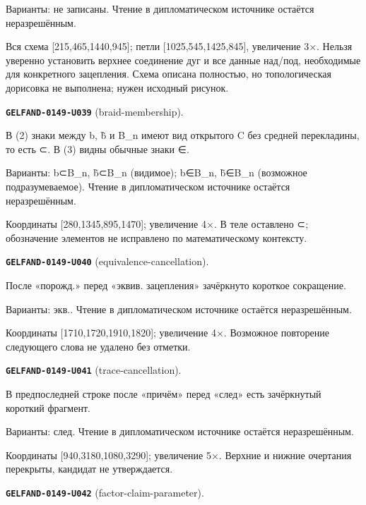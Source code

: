 \documentclass[11pt]{article}
\theoremstyle{definition}
\theoremstyle{remark}
\begin{document}
Варианты: не записаны. Чтение в дипломатическом источнике остаётся неразрешённым.\par
Вся схема [215,465,1440,945]; петли [1025,545,1425,845], увеличение 3×. Нельзя уверенно установить верхнее соединение дуг и все данные над/под, необходимые для конкретного зацепления. Схема описана полностью, но топологическая дорисовка не выполнена; нужен исходный рисунок.\par\medskip
\noindent\leavevmode{}\label{GELFAND-P001375:braid-membership:note}\textbf{\texttt{GELFAND-0149-U039}} (braid-membership).\par\nopagebreak[4]
В (2) знаки между b, b̃ и B\_n имеют вид открытого C без средней перекладины, то есть ⊂. В (3) видны обычные знаки ∈.\par
Варианты: b⊂B\_n, b̃⊂B\_n (видимое); b∈B\_n, b̃∈B\_n (возможное подразумеваемое). Чтение в дипломатическом источнике остаётся неразрешённым.\par
Координаты [280,1345,895,1470]; увеличение 4×. В теле оставлено ⊂; обозначение элементов не исправлено по математическому контексту.\par\medskip
\noindent\leavevmode{}\label{GELFAND-P001375:equivalence-cancellation:note}\textbf{\texttt{GELFAND-0149-U040}} (equivalence-cancellation).\par\nopagebreak[4]
После «порожд.» перед «эквив. зацепления» зачёркнуто короткое сокращение.\par
Варианты: экв.. Чтение в дипломатическом источнике остаётся неразрешённым.\par
Координаты [1710,1720,1910,1820]; увеличение 4×. Возможное повторение следующего слова не удалено без отметки.\par\medskip
\noindent\leavevmode{}\label{GELFAND-P001375:trace-cancellation:note}\textbf{\texttt{GELFAND-0149-U041}} (trace-cancellation).\par\nopagebreak[4]
В предпоследней строке после «причём» перед «след» есть зачёркнутый короткий фрагмент.\par
Варианты: след. Чтение в дипломатическом источнике остаётся неразрешённым.\par
Координаты [940,3180,1080,3290]; увеличение 5×. Верхние и нижние очертания перекрыты, кандидат не утверждается.\par\medskip
\noindent\leavevmode{}\label{GELFAND-P001375:factor-claim-parameter:note}\textbf{\texttt{GELFAND-0149-U042}} (factor-claim-parameter).\par\nopagebreak[4]
\end{document}
